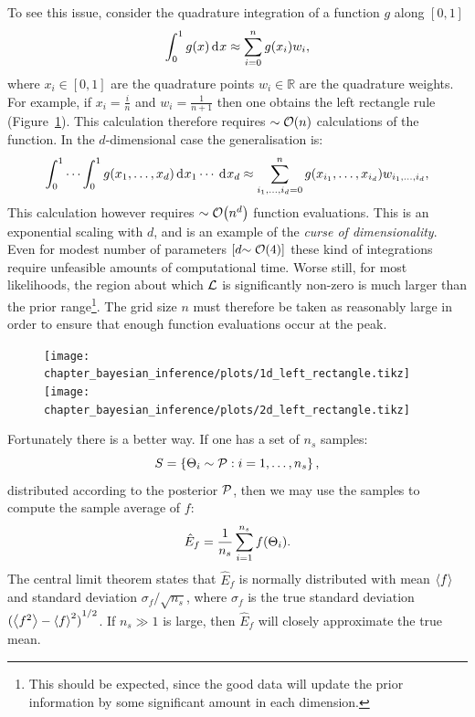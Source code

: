 To see this issue, consider the quadrature integration of a function $g$ along $[0,1]$
\begin{equation}
  \int_0^1 g(x) \operatorname{d}^{}\!{x} \approx \sum\limits_{i=0}^{n} g(x_i) w_i,
  \label{eqn:bay:quadrature_1d}
\end{equation}
where ${x_i\in[0,1]}$ are the quadrature points ${w_i\in\mathbb{R}}$ are the quadrature weights. For example, if $x_i = \frac{i}{n}$ and $w_i=\frac{1}{n+1}$ then one obtains the left rectangle rule (Figure~\ref{fig:bay:quadrature}). This calculation therefore requires ${\sim\mathcal{O}{\left(n\right)}}$ calculations of the function. In the $d$-dimensional case the generalisation is:
\begin{equation}
  \int_0^1\cdots\int_0^1 g(x_1,\ldots,x_d) \operatorname{d}^{}\!{x_1}\cdots \: \operatorname{d}^{}\!{x_d} \approx \sum\limits_{i_1,\ldots,i_d=0}^{n} g(x_{i_1},\ldots,x_{i_d}) w_{i_1,\ldots,i_d},
  \label{eqn:bay:quadrature_nd}
\end{equation}
This calculation however requires ${\sim\mathcal{O}{\left(n^d\right)}}$ function evaluations. This is an exponential scaling with $d$, and is an example of the {\em curse of dimensionality}. Even for modest number of parameters $\left[ d{\sim\mathcal{O}{\left(4\right)}} \right]$ these kind of integrations require unfeasible amounts of computational time. Worse still, for most likelihoods, the region about which $\mathcal{L}$ is significantly non-zero is much larger than the prior range\footnote{This should be expected, since the good data will update the prior information by some significant amount in each dimension.}. The grid size $n$ must therefore be taken as reasonably large in order to ensure that enough function evaluations occur at the peak.

\begin{figure}[ht]
  \centering
  \ifdefined\lightweight{}
  \else
    \texttt{[image: chapter\_bayesian\_inference/plots/1d\_left\_rectangle.tikz]}
    \texttt{[image: chapter\_bayesian\_inference/plots/2d\_left\_rectangle.tikz]}
  \fi
  \caption{\label{fig:bay:quadrature}}
\end{figure}

Fortunately there is a better way. If one has a set of $n_s$ samples:
\begin{equation}
  S = \left\{ \Theta_i\sim\mathcal{P}:i=1,\ldots,n_s \right\},
  \label{eqn:bay:samples}
\end{equation}
distributed according to the posterior $\mathcal{P}$, then we may use the samples to compute the sample average of $f$:
\begin{equation}
  \hat{E}_f = \frac{1}{n_s}\sum\limits_{i=1}^{n_s} f(\Theta_i).
  \label{eqn:bay:ehat}
\end{equation}
The central limit theorem states that $\hat{E}_f$ is normally distributed with mean ${\left\langle{f}\right\rangle}$ and standard deviation $\sigma_f/\sqrt{n_s}$, where $\sigma_f$ is the true standard deviation ${({\left\langle{f^2}\right\rangle}-{\left\langle{f}\right\rangle}^2)}^{1/2}$. If $n_s\gg 1$ is large, then $\hat{E}_f$ will closely approximate the true mean. 

